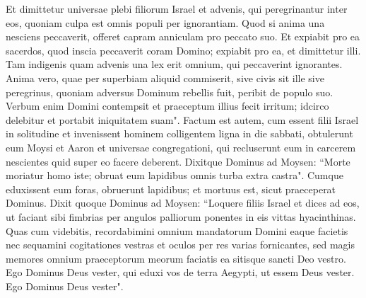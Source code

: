 \begin{biblechapter}
\verse Et dimittetur universae plebi filiorum Israel et advenis, qui peregrinantur inter eos, quoniam culpa est omnis populi per ignorantiam. 
\verse Quod si anima una nesciens peccaverit, offeret capram anniculam pro peccato suo. 
\verse Et expiabit pro ea sacerdos, quod inscia peccaverit coram Domino; expiabit pro ea, et dimittetur illi. 
\verse Tam indigenis quam advenis una lex erit omnium, qui peccaverint ignorantes. 
\verse Anima vero, quae per superbiam aliquid commiserit, sive civis sit ille sive peregrinus, quoniam adversus Dominum rebellis fuit, peribit de populo suo.  
\verse Verbum enim Domini contempsit et praeceptum illius fecit irritum; idcirco delebitur et portabit iniquitatem suam". 
\verse Factum est autem, cum essent filii Israel in solitudine et invenissent hominem colligentem ligna in die sabbati, 
\verse obtulerunt eum Moysi et Aaron et universae congregationi, 
\verse qui recluserunt eum in carcerem nescientes quid super eo facere deberent. 
\verse Dixitque Dominus ad Moysen: “Morte moriatur homo iste; obruat eum lapidibus omnis turba extra castra". 
\verse Cumque eduxissent eum foras, obruerunt lapidibus; et mortuus est, sicut praeceperat Dominus. 
\verse Dixit quoque Dominus ad Moysen: 
\verse “Loquere filiis Israel et dices ad eos, ut faciant sibi fimbrias per angulos palliorum ponentes in eis vittas hyacinthinas. 
\verse Quas cum videbitis, recordabimini omnium mandatorum Domini eaque facietis nec sequamini cogitationes vestras et oculos per res varias fornicantes, 
\verse sed magis memores omnium praeceptorum meorum faciatis ea sitisque sancti Deo vestro. 
\verse Ego Dominus Deus vester, qui eduxi vos de terra Aegypti, ut essem Deus vester. Ego Dominus Deus vester". 
\end{biblechapter}

